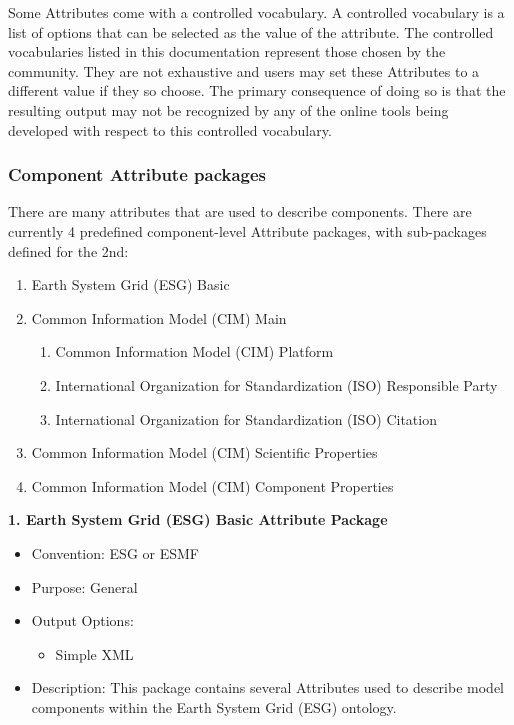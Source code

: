 Some Attributes come with a controlled vocabulary. A controlled vocabulary is a list of options that can be selected as the value of the attribute. The controlled vocabularies listed in this documentation represent those chosen by the community. They are not exhaustive and users may set these Attributes to a different value if they so choose. The primary consequence of doing so is that the resulting output may not be recognized by any of the online tools being developed with respect to this controlled vocabulary.  


\subsubsection{Component Attribute packages}
\label{ComponentAttributePackages}

There are many attributes that are used to describe components. There are currently 4 predefined component-level Attribute packages, with sub-packages defined for the 2nd:

\begin{enumerate}
    \item Earth System Grid (ESG) Basic
    \item Common Information Model (CIM) Main
    \begin{enumerate}
        \item Common Information Model (CIM) Platform
        \item International Organization for Standardization (ISO) Responsible Party
        \item International Organization for Standardization (ISO) Citation
    \end{enumerate}
    \item Common Information Model (CIM) Scientific Properties
    \item Common Information Model (CIM) Component Properties
\end{enumerate}

\vspace{.20in}

{\bf 1. Earth System Grid (ESG) Basic Attribute Package}

\begin{itemize}
    \item Convention: ESG or ESMF
    \item Purpose: General
    \item Output Options:
    \begin{itemize}
        \item Simple XML
    \end{itemize} 
    \item Description: This package contains several Attributes used to describe model components within the Earth System Grid (ESG) ontology. 
\end{itemize}


